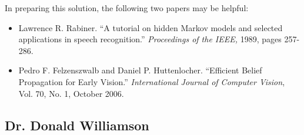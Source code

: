\documentclass[11pt]{article}
\begin{document}
\begin{appendices}
\begin{enumerate}
In preparing this solution, the following two papers may be helpful:

\begin{itemize}
\item  Lawrence R. Rabiner. ``A  tutorial on hidden Markov models and
selected applications in speech recognition.'' \textit{Proceedings of
the IEEE,} 1989, pages 257-286.
\item Pedro F. Felzenszwalb and Daniel P. Huttenlocher. ``Efficient
Belief Propagation for Early Vision.''
\textit{International Journal of Computer Vision}, Vol. 70, No. 1, October 2006.
\end{itemize}


\end{enumerate}


\subsection{Dr. Donald Williamson}

\end{appendices}
\end{document}
